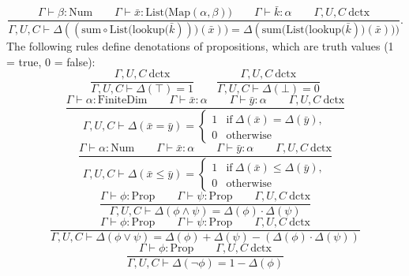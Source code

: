 \documentclass[11pt]{article}
\begin{document}
\begin{equation}
	\frac{
		\Gamma \vdash \beta : \text{Num}
		\qquad \Gamma \vdash \bar{x} : \text{List(Map}(\alpha, \beta))
		\qquad \Gamma \vdash \bar{k} : \alpha
		\qquad \Gamma,U,C\ \text{dctx}
	}{
		\Gamma,U,C \vdash \Delta((\text{sum} \circ \text{List(lookup(}\bar{k})))(\bar{x}))
		= \Delta(\text{sum(List(lookup(}\bar{k}))(\bar{x})))
	}.
\end{equation}
The following rules define denotations of propositions, which are truth values
(1 = true, 0 = false):
\begin{equation}
	\frac{\Gamma,U,C\ \text{dctx}}
	{\Gamma,U,C \vdash \Delta(\top) = 1}
	\qquad
	\frac{\Gamma,U,C\ \text{dctx}}
	{\Gamma,U,C \vdash \Delta(\bot) = 0}
\end{equation}
\begin{equation}
	\frac{
		\Gamma \vdash \alpha : \text{FiniteDim}
		\qquad \Gamma \vdash \bar{x} : \alpha
		\qquad \Gamma \vdash \bar{y} : \alpha
		\qquad \Gamma,U,C\ \text{dctx}
	}{
		\Gamma,U,C \vdash \Delta(\bar{x} = \bar{y})
		= \begin{cases}
			1 & \text{if}\ \Delta(\bar{x}) = \Delta(\bar{y}), \\
			0 & \text{otherwise}
		\end{cases}
	}
\end{equation}
\begin{equation}
	\frac{
		\Gamma \vdash \alpha : \text{Num}
		\qquad \Gamma \vdash \bar{x} : \alpha
		\qquad \Gamma \vdash \bar{y} : \alpha
		\qquad \Gamma,U,C\ \text{dctx}
	}{
		\Gamma,U,C \vdash \Delta(\bar{x} \leq \bar{y})
		= \begin{cases}
			1 & \text{if}\ \Delta(\bar{x}) \leq \Delta(\bar{y}), \\
			0 & \text{otherwise}
		\end{cases}
	}
\end{equation}
\begin{equation}
	\frac{
		\Gamma \vdash \phi : \text{Prop}
		\qquad \Gamma \vdash \psi : \text{Prop}
		\qquad \Gamma,U,C\ \text{dctx}
	}{
		\Gamma,U,C \vdash \Delta(\phi \wedge \psi) = \Delta(\phi) \cdot \Delta(\psi)
	}
\end{equation}
\begin{equation}
	\frac{
		\Gamma \vdash \phi : \text{Prop}
		\qquad \Gamma \vdash \psi : \text{Prop}
		\qquad \Gamma,U,C\ \text{dctx}
	}{
		\Gamma,U,C \vdash \Delta(\phi \vee \psi)
		= \Delta(\phi) + \Delta(\psi) - (\Delta(\phi) \cdot \Delta(\psi))
	}
\end{equation}
\begin{equation}
	\frac{
		\Gamma \vdash \phi : \text{Prop}
		\qquad \Gamma,U,C\ \text{dctx}
	}{
		\Gamma,U,C \vdash \Delta(\neg\phi) = 1 - \Delta(\phi)
	}
\end{equation}
\end{document}
